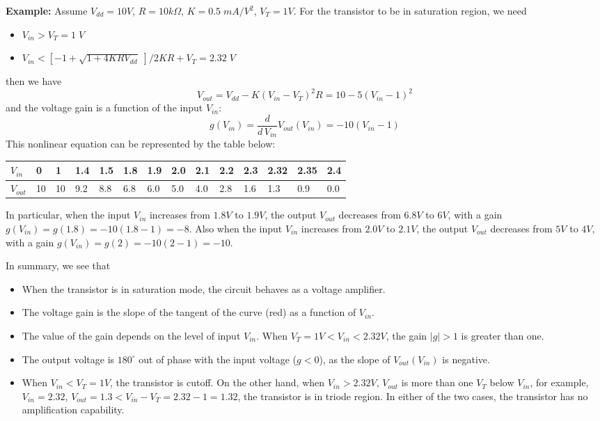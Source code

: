 \documentclass{article}
\begin{document}
{\bf Example:} Assume $V_{dd}=10V$, $R=10 k\Omega$, $K=0.5\;mA/V^2$, $V_T=1V$.
For the transistor to be in saturation region, we need
\begin{itemize}
\item $V_{in}>V_T=1\;V$ 
\item $V_{in}<[-1+\sqrt{1+4KRV_{dd}}\;]/2KR+V_T=2.32\;V $
\end{itemize}
then we have
\begin{equation}
V_{out}=V_{dd}-K(V_{in}-V_T)^2 R=10-5(V_{in}-1)^2 
\end{equation}
and the voltage gain is a function of the input $V_{in}$:
\begin{equation} g(V_{in})=\frac{d}{d\,V_{in}} V_{out}(V_{in})=-10(V_{in}-1) \end{equation}
This nonlinear equation can be represented by the table below:
\begin{tabular}{l | lllllllllllll} 
$V_{in} $ & 0  & 1  & 1.4 & 1.5 & 1.8 & 1.9 & 2.0 & 2.1 & 2.2 & 2.3 & 2.32 & 2.35 & 2.4 \\ \hline
$V_{out}$ & 10 & 10 & 9.2 & 8.8 & 6.8 & 6.0 & 5.0 & 4.0 & 2.8 & 1.6 & 1.3  & 0.9  & 0.0 
\end{tabular}
In particular, when the input $V_{in}$ increases from $1.8V$ to $1.9V$, the output 
$V_{out}$ decreases from $6.8V$ to $6V$, with a gain $g(V_{in})=g(1.8)=-10(1.8-1)=-8$.
Also when the input $V_{in}$ increases from $2.0V$ to $2.1V$, the output $V_{out}$ 
decreases from $5V$ to $4V$, with a gain $g(V_{in})=g(2)=-10(2-1)=-10$. 


In summary, we see that
\begin{itemize}
\item When the transistor is in saturation mode, the circuit behaves as a voltage amplifier.
\item The voltage gain is the slope of the tangent of the curve (red) as a function of $V_{in}$.
\item The value of the gain depends on the level of input $V_{in}$. When 
  $V_T=1V<V_{in}<2.32V$, the gain $|g|>1$ is greater than one.
\item The output voltage is $180^\circ$ out of phase with the input voltage ($g<0$),
  as the slope of $V_{out}(V_{in})$ is negative.
\item When $V_{in}<V_T=1V$, the transistor is cutoff.  On the other hand, when 
  $V_{in}>2.32V$, $V_{out}$ is more than one $V_T$ below $V_{in}$, for example, 
  $V_{in}=2.32$, $V_{out}=1.3<V_{in}-V_T=2.32-1=1.32$, the transistor is in triode
  region. In either of the two cases, the transistor has no amplification capability.
\end{itemize}
\end{document}
